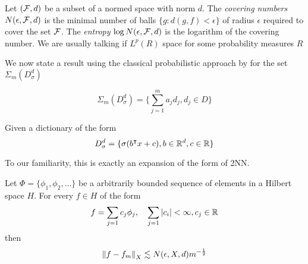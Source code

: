 \begin{definition}
    \label{def:covering_num}
    Let $(\mathcal{F}, d)$ be a subset of a normed space with norm $d$. The
    \textit{covering numbers} $N(\epsilon, \mathcal{F}, d)$ is the minimal number
    of balls $\{g: d(g, f) < \epsilon\}$ of radius $\epsilon$ required to cover
    the set $\mathcal{F}$. The \textit{entropy} $\log N(\epsilon, \mathcal{F}, d)$ is
    the logarithm of the covering number. We are usually talking if $L^p(R)$ space
    for some probability measures $R$
\end{definition}


We now state a result using the classical probabilistic approach by
\cite{pisierRemarquesResultatNon1980} for the set $\Sigma_m(D_{\sigma}^d)$

\begin{equation}
    \label{eq:sigma_set}
    \Sigma_m(D_{\sigma}^d) = \{\sum_{j=1}^m a_j d_j, d_j \in D\}
\end{equation}

Given a dictionary of the form
\begin{equation}
    \label{eq:dict_sigma}
    D_{\sigma}^d = \{\sigma(b{}^{\intercal} x + c), b \in \mathbb{R}^d, c \in \mathbb{R}\}
\end{equation}

To our familiarity, this is exactly an expansion of the form of 2NN.

\begin{theorem}
    \label{thm:maurey}
    Let $\Phi = \{\phi_1, \phi_2, \dots\}$ be a arbitrarily bounded sequence of
    elements in a Hilbert space $H$. For every $f \in H$ of the form
    \begin{equation}
        f = \sum_{j=1} c_j \phi_j, \quad
            \sum_{j=1} \left| c_i \right| < \infty, c_j \in \mathbb{R} 
    \end{equation}
    then
    \begin{equation}
        \left\| f - f_m \right\|_{X} \lesssim N(\epsilon, X, d) m^{-\frac{1}{2}} 
    \end{equation}
\end{theorem}


